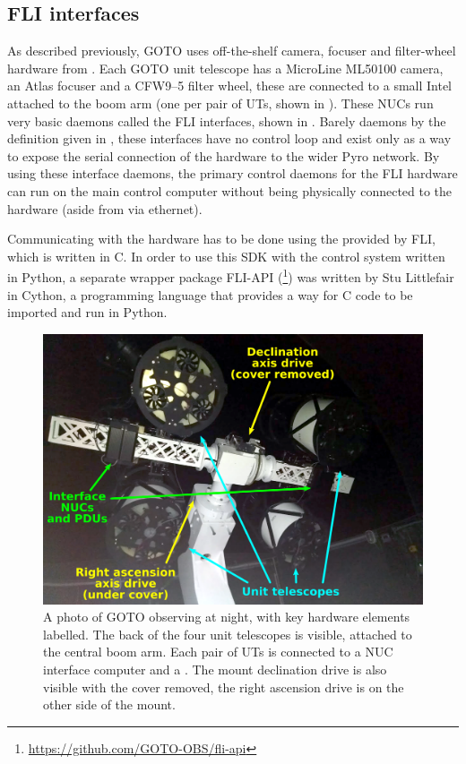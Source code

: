\subsection{FLI interfaces}
\label{sec:fli}
\begin{colsection}

As described previously, GOTO uses off-the-shelf camera, focuser and filter-wheel hardware from . Each GOTO unit telescope has a MicroLine ML50100 camera, an Atlas focuser and a CFW9--5 filter wheel, these are connected to a small Intel  attached to the boom arm (one per pair of UTs, shown in ). These NUCs run very basic daemons called the FLI interfaces, shown in . Barely daemons by the definition given in , these interfaces have no control loop and exist only as a way to expose the serial connection of the hardware to the wider Pyro network. By using these interface daemons, the primary control daemons for the FLI hardware can run on the main control computer without being physically connected to the hardware (aside from via ethernet).

Communicating with the hardware has to be done using the  provided by FLI, which is written in C. In order to use this SDK with the control system written in Python, a separate wrapper package FLI-API (\footnote{\url{https://github.com/GOTO-OBS/fli-api}}) was written by Stu Littlefair in Cython, a programming language that provides a way for C code to be imported and run in Python.

\begin{figure}[t]
    \begin{center}
        \includegraphics[width=\linewidth]{images/boomarm.pdf}
    \end{center}
    \caption[Photo of GOTO with hardware elements labelled]{
        A photo of GOTO observing at night, with key hardware elements labelled. The back of the four unit telescopes is visible, attached to the central boom arm. Each pair of UTs is connected to a NUC interface computer and a . The mount declination drive is also visible with the cover removed, the right ascension drive is on the other side of the mount.
    }\label{fig:boomarm}
\end{figure}


\end{colsection}
